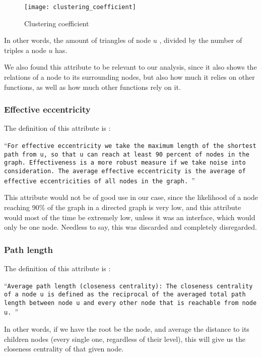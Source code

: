 \begin{figure}[!htb]
	\caption{Clustering coefficient}
	\centering
	\texttt{[image: clustering\_coefficient]}
\end{figure}

In other words, the amount of triangles of node $u$ , divided by the number of triples a node $u$ has.

We also found this attribute to be relevant to our analysis, since it also shows the relations of a node to its surrounding nodes, but also how much it relies on other functions, as well as how much other functions rely on it.

\subsubsection{Effective eccentricity}

The definition of this attribute is :

\enquote{\texttt{For effective eccentricity we take the
		maximum length of the shortest path from u, so that
		u can reach at least 90 percent of nodes in the graph.
		Effectiveness is a more robust measure if we take noise
		into consideration. The average effective eccentricity
		is the average of effective eccentricities of all nodes in the graph.
}}\parencite{graphClassification}

This attribute would not be of good use in our case, since the likelihood of a node reaching 90\% of the graph in a directed graph is very low, and this attribute would most of the time be extremely low, unless it was an interface, which would only be one node. Needless to say, this was discarded and completely disregarded.

\subsubsection{Path length}

The definition of this attribute is :

\enquote{\texttt{Average path length (closeness centrality): The
		closeness centrality of a node u is defined as the reciprocal of the averaged total path length between node
		u and every other node that is reachable from node
		u.		
}}\parencite{graphClassification}

In other words, if we have the root be the node, and average the distance to its children nodes (every single one, regardless of their level), this will give us the closeness centrality of that given node.

